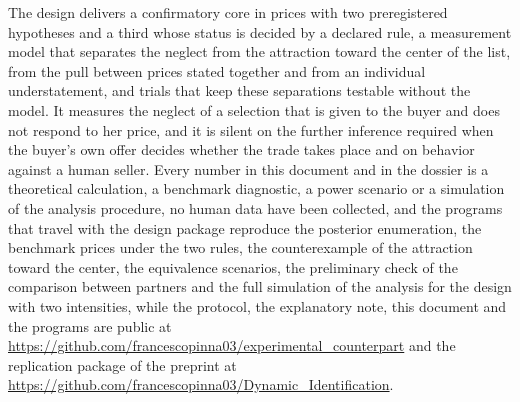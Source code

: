 \documentclass[11pt,a4paper]{article}
\begin{document}
The design delivers a confirmatory core in prices with two preregistered hypotheses and a third whose status is decided by a declared rule, a measurement model that separates the neglect from the attraction toward the center of the list, from the pull between prices stated together and from an individual understatement, and trials that keep these separations testable without the model. It measures the neglect of a selection that is given to the buyer and does not respond to her price, and it is silent on the further inference required when the buyer's own offer decides whether the trade takes place and on behavior against a human seller. Every number in this document and in the dossier is a theoretical calculation, a benchmark diagnostic, a power scenario or a simulation of the analysis procedure, no human data have been collected, and the programs that travel with the design package reproduce the posterior enumeration, the benchmark prices under the two rules, the counterexample of the attraction toward the center, the equivalence scenarios, the preliminary check of the comparison between partners and the full simulation of the analysis for the design with two intensities, while the protocol, the explanatory note, this document and the programs are public at \url{https://github.com/francescopinna03/experimental_counterpart} and the replication package of the preprint at \url{https://github.com/francescopinna03/Dynamic_Identification}.
\end{document}
